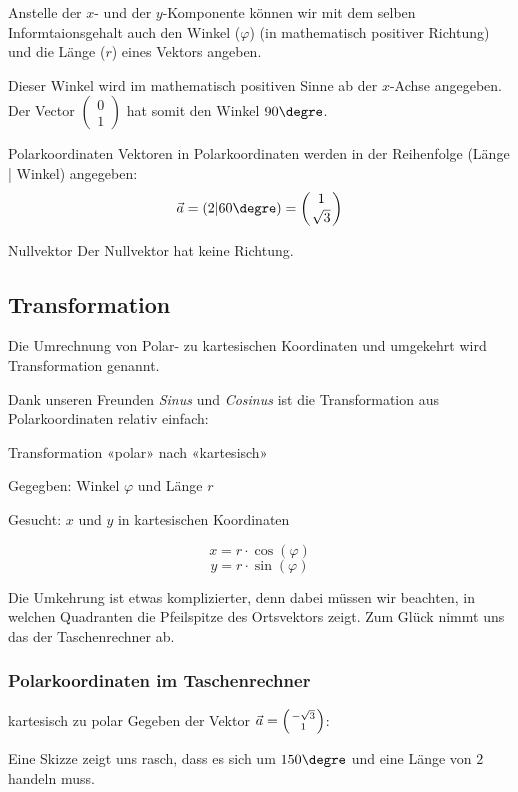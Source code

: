 
\newpage

Anstelle der $x$- und der $y$-Komponente können wir mit dem selben
Informtaionsgehalt auch den Winkel ($\varphi$)
(in mathematisch positiver Richtung) und die Länge ($r$) eines Vektors
angeben.


Dieser Winkel wird im mathematisch positiven Sinne ab der $x$-Achse
angegeben. Der Vector
$\begin{pmatrix}0\\1\end{pmatrix}$ hat somit den Winkel $90\degre$.
  \begin{definition}{Polarkoordinaten}{}
    Vektoren in Polarkoordinaten werden in der Reihenfolge (Länge |
    Winkel) angegeben:
    $$\vec{a} = (2 | 60\degre) = \left(1\atop \sqrt{3}\right)$$
    \end{definition}
  \begin{bemerkung}{Nullvektor}{}
    Der Nullvektor hat keine Richtung.
    \end{bemerkung}
  \newpage
\subsection{Transformation}
  Die Umrechnung von Polar- zu kartesischen
  Koordinaten und umgekehrt wird Transformation genannt.
  
  Dank unseren Freunden \textit{Sinus} und \textit{Cosinus} ist die
  Transformation aus Polarkoordinaten relativ einfach:
  \begin{rezept}{Transformation «polar» nach «kartesisch»}{}

    Gegegben:  Winkel $\varphi$ und Länge $r$

    Gesucht: $x$ und $y$ in kartesischen Koordinaten

    $$x = r\cdot{}\cos(\varphi)$$
    $$y = r\cdot{}\sin(\varphi)$$
  \end{rezept}

  Die Umkehrung ist etwas komplizierter, denn dabei müssen wir
  beachten, in welchen Quadranten die Pfeilspitze des Ortsvektors
  zeigt.
  Zum Glück nimmt uns das der Taschenrechner ab.

  \subsubsection{Polarkoordinaten im Taschenrechner}
  \begin{beispiel}{kartesisch zu polar}{}
    Gegeben der Vektor $\vec{a} = \left(-\sqrt{3} \atop 1\right)$:

    Eine Skizze zeigt uns rasch, dass es sich um $150\degre$ und eine
    Länge von $2$ handeln muss.

    \end{beispiel}
  \newpage

